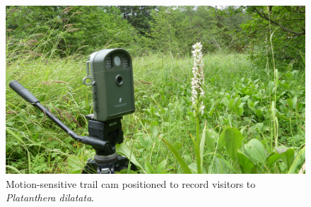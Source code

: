 \begin{figure}[H]
\begin{center}
\vspace{2mm}
\includegraphics[width=\textwidth]{img/camera.jpg}
\caption{Motion-sensitive trail cam positioned to record visitors to \emph{Platanthera dilatata}.}
\label{camera}
\end{center}
\end{figure} 
